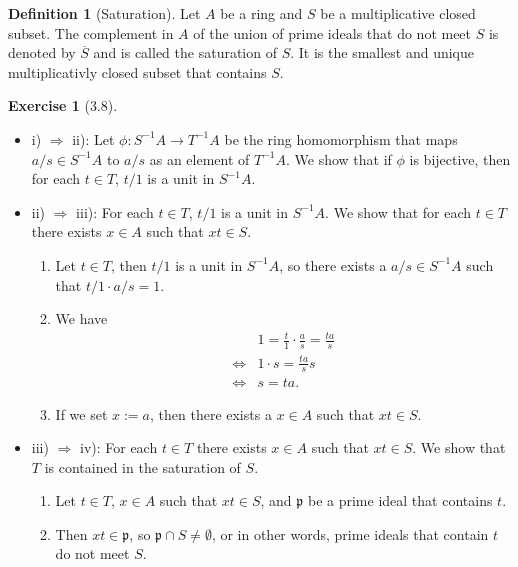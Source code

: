 \documentclass{book}
\theoremstyle{plain}
\theoremstyle{definition}
\newtheorem{exercise}[theorem]{Exercise}
\theoremstyle{custom_definition}
\newtheorem{definition}[theorem]{Definition}
\begin{document}
\begin{definition}[Saturation]
    Let \(A\) be a ring and \(S\) be a multiplicative closed subset. The complement in \(A\) of the union of prime ideals that do not meet \(S\) is denoted by \(\overline{S}\) and is called the saturation of \(S\). It is the smallest and unique multiplicativly closed subset that contains \(S\).
\end{definition}

\begin{exercise}[3.8]
    \begin{itemize}
        \item i) \(\Rightarrow\) ii): Let \(\phi: S^{-1}A \longrightarrow T^{-1}A\) be the ring homomorphism that maps \(a/s \in S^{-1}A\) to \(a/s\) as an element of \(T^{-1}A\). We show that if \(\phi\) is bijective, then for each \(t \in T\), \(t/1\) is a unit in \(S^{-1}A\).
        \item ii) \(\Rightarrow\) iii): For each \(t \in T\), \(t/1\) is a unit in \(S^{-1}A\). We show that for each \(t \in T\) there exists \(x \in A\) such that \(xt \in S\).
        \begin{enumerate}
            \item Let \(t \in T\), then \(t/1\) is a unit in \(S^{-1}A\), so there exists a \(a/s \in S^{-1}A\) such that \(t/1 \cdot a/s = 1\).
            \item We have
            \begin{align}
                & 1 = \frac{t}{1} \cdot \frac{a}{s} = \frac{t a}{s} \\
                \iff & 1 \cdot s = \frac{t a}{s} s \\
                \iff & s = t a \text{.}
            \end{align}
            \item If we set \(x := a\), then there exists a \(x \in A\) such that \(xt \in S\).
        \end{enumerate}
        \item iii) \(\Rightarrow\) iv): For each \(t \in T\) there exists \(x \in A\) such that \(xt \in S\). We show that \(T\) is contained in the saturation of \(S\).
        \begin{enumerate}
            \item Let \(t \in T\), \(x \in A\) such that \(xt \in S\), and \(\mathfrak{p}\) be a prime ideal that contains \(t\).
            \item Then \(xt \in \mathfrak{p}\), so \(\mathfrak{p} \cap S \neq \emptyset\), or in other words, prime ideals that contain \(t\) do not meet \(S\).

\end{enumerate}
\end{itemize}
\end{exercise}
\end{document}
